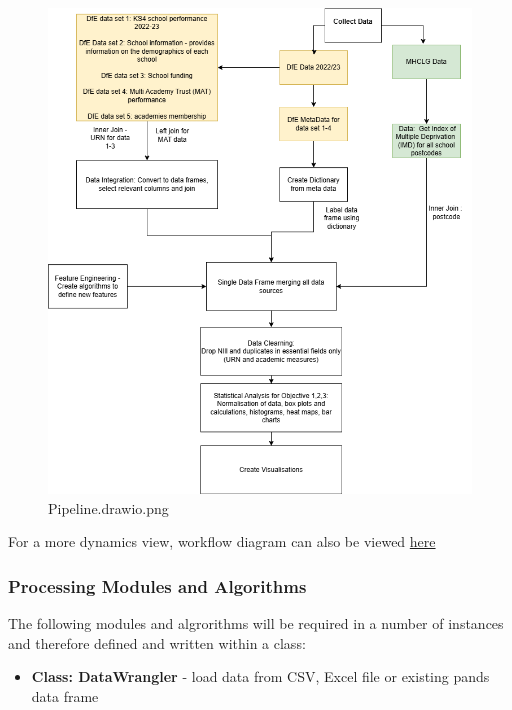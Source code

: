 \documentclass[
  letterpaper,
  DIV=11,
  numbers=noendperiod]{scrartcl}
\providecommand{\tightlist}{%
  \setlength{\itemsep}{0pt}\setlength{\parskip}{0pt}}\usepackage{longtable,booktabs,array}
\begin{document}
\begin{figure}[H]

{\centering \includegraphics{P4DS_A2_Data_Analysis_Project_files/figure-pdf/cell-10-1-Pipeline.drawio.png}

}

\caption{Pipeline.drawio.png}

\end{figure}%

For a more dynamics view, workflow diagram can also be viewed
\href{https://padlet.com/saqib_safdar/saqib-safdar-pipleline-and-workflow-w1f0iib7imo5jrkg}{here}

\subsubsection{Processing Modules and
Algorithms}\label{processing-modules-and-algorithms}

The following modules and algrorithms will be required in a number of
instances and therefore defined and written within a class:

\begin{itemize}
\tightlist
\item
  \textbf{Class: DataWrangler} - load data from CSV, Excel file or
  existing pands data frame
\end{itemize}
\end{document}
